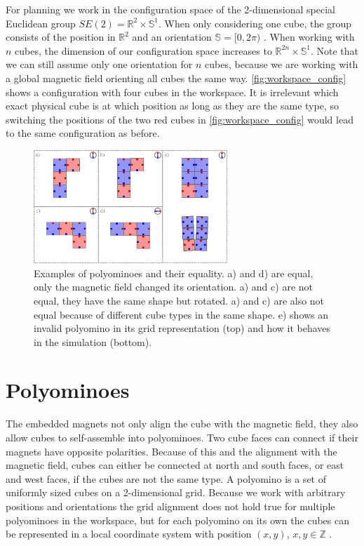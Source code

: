 For planning we work in the configuration space of the 2-dimensional special Euclidean group $SE(2) = \mathbb{R}^2 \times \mathbb{S}^1$.
When only considering one cube, the group consists of the position in $\mathbb{R}^2$ and an orientation $\mathbb{S} = [0,2\pi)$ \cite{LaValle2006}.
When working with $n$ cubes, the dimension of our configuration space increases to $\mathbb{R}^{2n} \times \mathbb{S}^1$.
Note that we can still assume only one orientation for $n$ cubes, because we are working with a global magnetic field orienting all cubes the same way.
\autoref{fig:workspace_config} shows a configuration with four cubes in the workspace.
It is irrelevant which exact physical cube is at which position as long as they are the same type, so switching the positions of the two red cubes in \autoref{fig:workspace_config} would lead to the same configuration as before.

\begin{figure}
	\centering
	\includegraphics[width=0.65\textwidth]{figures/polyominoes.pdf}
	\caption[Examples of Polyominoes and their equality]{Examples of polyominoes and their equality. a) and d) are equal, only the magnetic field changed its orientation. a) and c) are not equal, they have the same shape but rotated. a) and c) are also not equal because of different cube types in the same shape. e) shows an invalid polyomino in its grid representation (top) and how it behaves in the simulation (bottom).}
	\label{fig:polyominoes}
\end{figure}

\section{Polyominoes}
\label{sec:polys}
The embedded magnets not only align the cube with the magnetic field, they also allow cubes to self-assemble into polyominoes.
Two cube faces can connect if their magnets have opposite polarities.
Because of this and the alignment with the magnetic field, cubes can either be connected at north and south faces, or east and west faces, if the cubes are not the same type.
A polyomino is a set of uniformly sized cubes on a 2-dimensional grid.
Because we work with arbitrary positions and orientations the grid alignment does not hold true for multiple polyominoes in the workspace, but for each polyomino on its own the cubes can be represented in a local coordinate system with position $(x,y)$, $x,y \in \mathbb{Z}$ \cite{Lu2021}.

